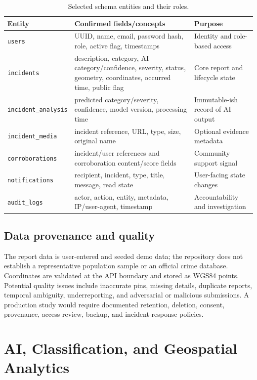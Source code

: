 \documentclass[11pt]{article}
\begin{document}
\begin{table}[H]
\centering
\caption{Selected schema entities and their roles.}
\label{tab:schema}
\small
\begin{tabularx}{\textwidth}{p{}p{}X}
\toprule
\textbf{Entity} & \textbf{Confirmed fields/concepts} & \textbf{Purpose}\\
\midrule
\texttt{users} & UUID, name, email, password hash, role, active flag, timestamps & Identity and role-based access\\
\texttt{incidents} & description, category, AI category/confidence, severity, status, geometry, coordinates, occurred time, public flag & Core report and lifecycle state\\
\texttt{incident\_analysis} & predicted category/severity, confidence, model version, processing time & Immutable-ish record of AI output\\
\texttt{incident\_media} & incident reference, URL, type, size, original name & Optional evidence metadata\\
\texttt{corroborations} & incident/user references and corroboration content/score fields & Community support signal\\
\texttt{notifications} & recipient, incident, type, title, message, read state & User-facing state changes\\
\texttt{audit\_logs} & actor, action, entity, metadata, IP/user-agent, timestamp & Accountability and investigation\\
\bottomrule
\end{tabularx}
\end{table}

\subsection{Data provenance and quality}

The report data is user-entered and seeded demo data; the repository does
not establish a representative population sample or an official crime
database. Coordinates are validated at the API boundary and stored as
WGS84 points. Potential quality issues include inaccurate pins, missing
details, duplicate reports, temporal ambiguity, underreporting, and
adversarial or malicious submissions. A production study would require
documented retention, deletion, consent, provenance, access review, backup,
and incident-response policies.

\section{AI, Classification, and Geospatial Analytics}
\label{sec:ai}
\end{document}
